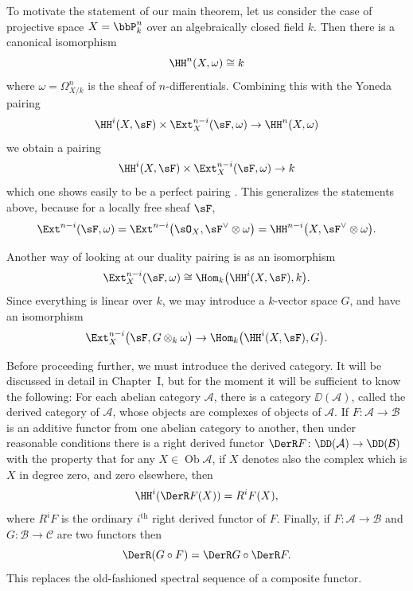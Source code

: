 To motivate the statement of our main theorem, let us consider the case of projective space $X=\bbP_{k}^{n}$ over an algebraically closed field $k$. Then there is a canonical isomorphism
\begin{equation}\label{eq:1}
	\HH^{n}(X, \omega)\cong k
\end{equation}
where $\omega=\Omega_{X/k}^{n}$ is the sheaf of $n$-differentials. Combining this with the Yoneda pairing
\begin{equation}\label{eq:2}
	\HH^{i}(X, \sF)\times \Ext_{X}^{n-i}(\sF,\omega)\to \HH^{n}(X,\omega)
\end{equation}
we obtain a pairing
\begin{equation}\label{eq:3}
	\HH^{i}(X, \sF)\times \Ext_{X}^{n-i}(\sF,\omega)\to k
\end{equation}
which one shows easily to be a perfect pairing \cite{SGA 62, expose 12}. This generalizes the statements above, because for a locally free sheaf $\sF$,
\[
\Ext^{n-i}(\sF,\omega)=\Ext^{n-i}\bigl(\sO_{X},\sF^{\vee}\otimes\omega\bigr)=\HH^{n-i}\bigl(X,\sF^{\vee}\otimes\omega\bigr).
\]

Another way of looking at our duality pairing is as an isomorphism
\begin{equation}\label{eq:4}
	\Ext_{X}^{n-i}(\sF,\omega)\cong \Hom_{k}\bigl(\HH^{i}(X,\sF),k\bigr).
\end{equation}
Since everything is linear over $k$, we may introduce a $k$-vector space $G$, and have an isomorphism
\begin{equation}\label{eq:5}
	\Ext_{X}^{n-i}\bigl(\sF,G\otimes_{k}\omega\bigr)\to \Hom_{k}\bigl(\HH^{i}(X,\sF),G\bigr).
\end{equation}

Before proceeding further, we must introduce the derived category. It will be discussed in detail in Chapter~I, but for the moment it will be sufficient to know the following: For each abelian category $\mathcal{A}$, there is a category $\DD(\mathcal{A})$, called the derived category of $\mathcal{A}$, whose objects are complexes of objects of $\mathcal{A}$. If $F\colon\mathcal{A}\to\mathcal{B}$ is an additive functor from one abelian category to another, then under reasonable conditions there is a right derived functor $\DerR F\colon \DD(\mathcal{A})\to \DD(\mathcal{B})$ with the property that for any $X\in\operatorname{Ob}\mathcal{A}$, if $X$ denotes also the complex which is $X$ in degree zero, and zero elsewhere, then
\[
\HH^{i}(\DerR F(X))=R^{i}F(X),
\]
where $R^{i}F$ is the ordinary $i^{\text{th}}$ right derived functor of $F$. Finally, if $F\colon\mathcal{A}\to\mathcal{B}$ and $G\colon\mathcal{B}\to\mathcal{C}$ are two functors then
\[
\DerR(G\circ F)=\DerR G\circ \DerR F.
\]
This replaces the old-fashioned spectral sequence of a composite functor.

